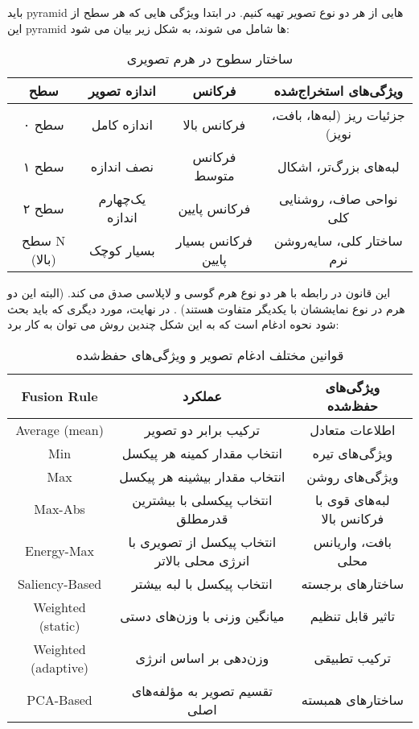 \documentclass[a4paper,12pt]{article}
\begin{document}
باید pyramid هایی از هر دو نوع تصویر تهیه کنیم. در ابتدا ویژگی هایی که هر سطح از این pyramid ها شامل می شوند، به شکل زیر بیان می شود:
\begin{table}[h]
	\centering
	\begin{tabular}{|c|c|c|c|}
		\hline
		\textbf{سطح} & \textbf{اندازه تصویر} & \textbf{فرکانس} & \textbf{ویژگی‌های استخراج‌شده} \\
		\hline
		سطح ۰ & اندازه کامل & فرکانس بالا & جزئیات ریز (لبه‌ها، بافت، نویز) \\
		\hline
		سطح ۱ & نصف اندازه & فرکانس متوسط & لبه‌های بزرگ‌تر، اشکال \\
		\hline
		سطح ۲ & یک‌چهارم اندازه & فرکانس پایین & نواحی صاف، روشنایی کلی \\
		\hline
		سطح N (بالا) & بسیار کوچک & فرکانس بسیار پایین & ساختار کلی، سایه‌روشن نرم \\
		\hline
	\end{tabular}
	\caption{ساختار سطوح در هرم تصویری}
\end{table}
این قانون در رابطه با هر دو نوع هرم گوسی و لاپلاسی صدق می کند. (البته این دو هرم در نوع نمایششان با یکدیگر متفاوت هستند) .
در نهایت، مورد دیگری که باید بحث شود نحوه ادغام است که به این شکل چندین روش می توان به کار برد:
\begin{table}[h]
	\centering
	\begin{tabular}{|c|c|c|}
		\hline
		\textbf{Fusion Rule} & \textbf{عملکرد} & \textbf{ویژگی‌های حفظ‌شده} \\
		\hline
		Average (mean) & ترکیب برابر دو تصویر & اطلاعات متعادل \\
		\hline
		Min & انتخاب مقدار کمینه هر پیکسل & ویژگی‌های تیره \\
		\hline
		Max & انتخاب مقدار بیشینه هر پیکسل & ویژگی‌های روشن \\
		\hline
		Max-Abs & انتخاب پیکسلی با بیشترین قدرمطلق & لبه‌های قوی با فرکانس بالا \\
		\hline
		Energy-Max & انتخاب پیکسل از تصویری با انرژی محلی بالاتر & بافت، واریانس محلی \\
		\hline
		Saliency-Based & انتخاب پیکسل با لبه بیشتر & ساختارهای برجسته \\
		\hline
		Weighted (static) & میانگین وزنی با وزن‌های دستی & تاثیر قابل تنظیم \\
		\hline
		Weighted (adaptive) & وزن‌دهی بر اساس انرژی & ترکیب تطبیقی \\
		\hline
		PCA-Based & تقسیم تصویر به مؤلفه‌های اصلی & ساختارهای همبسته \\ 
		\hline
	\end{tabular}
	\caption{قوانین مختلف ادغام تصویر و ویژگی‌های حفظ‌شده}
\end{table}
\end{document}
